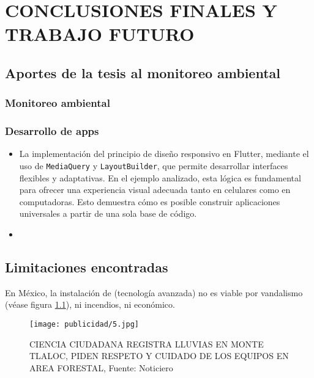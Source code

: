 \chapter{CONCLUSIONES FINALES Y TRABAJO FUTURO}



\section{Aportes de la tesis al monitoreo ambiental}
\subsection{Monitoreo ambiental}
\subsection{Desarrollo de apps}

\begin{itemize}
  \item La implementación del principio de diseño responsivo en Flutter, mediante el uso de \texttt{MediaQuery} y \texttt{LayoutBuilder}, que permite desarrollar interfaces flexibles y adaptativas. En el ejemplo analizado, esta lógica es fundamental para ofrecer una experiencia visual adecuada tanto en celulares como en computadoras. Esto demuestra cómo es posible construir aplicaciones universales a partir de una sola base de código.
  \item 

\end{itemize}
\section{Limitaciones encontradas}

En México, la instalación de (tecnología avanzada) no es viable por vandalismo (véase figura \ref{publicidad5}), ni incendios, ni económico.


\begin{figure}[h!]
\centering
  \texttt{[image: publicidad/5.jpg]}
  \caption{CIENCIA CIUDADANA REGISTRA LLUVIAS EN MONTE TLALOC, PIDEN RESPETO Y
  CUIDADO DE LOS EQUIPOS EN AREA FORESTAL, Fuente: Noticiero}
  \label{publicidad5}
\end{figure}

